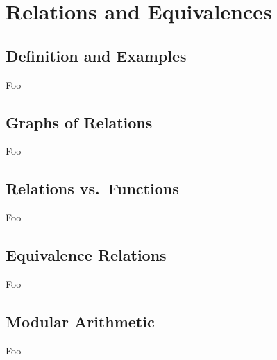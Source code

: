 \section{Relations and Equivalences}

\subsection{Definition and Examples}

Foo

\subsection{Graphs of Relations}

Foo

\subsection{Relations vs.\ Functions}

Foo

\subsection{Equivalence Relations}

Foo

\subsection{Modular Arithmetic}

Foo

